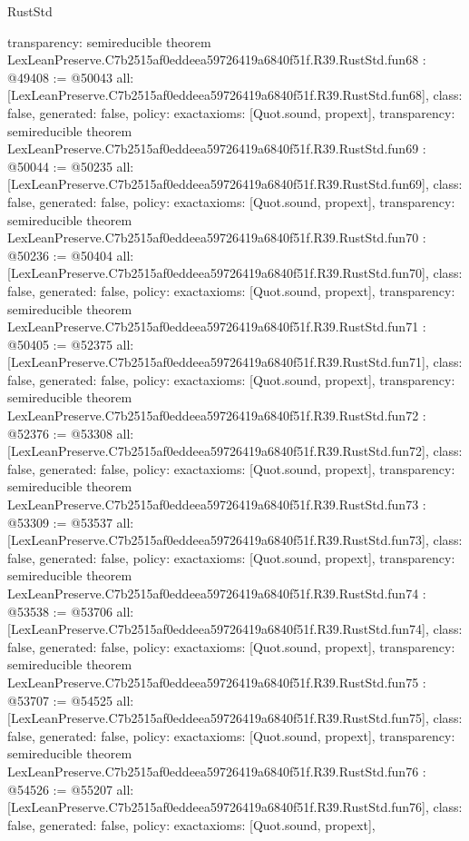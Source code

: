 \begin{lexlean}{RustStd}
\begin{coremodule}
{  transparency: semireducible
}
theorem LexLeanPreserve.C7b2515af0eddeea59726419a6840f51f.R39.RustStd.fun68 : @49408 := @50043 {
  all: [LexLeanPreserve.C7b2515af0eddeea59726419a6840f51f.R39.RustStd.fun68],
  class: false,
  generated: false,
  policy: exact{axioms: [Quot.sound, propext]},
  transparency: semireducible
}
theorem LexLeanPreserve.C7b2515af0eddeea59726419a6840f51f.R39.RustStd.fun69 : @50044 := @50235 {
  all: [LexLeanPreserve.C7b2515af0eddeea59726419a6840f51f.R39.RustStd.fun69],
  class: false,
  generated: false,
  policy: exact{axioms: [Quot.sound, propext]},
  transparency: semireducible
}
theorem LexLeanPreserve.C7b2515af0eddeea59726419a6840f51f.R39.RustStd.fun70 : @50236 := @50404 {
  all: [LexLeanPreserve.C7b2515af0eddeea59726419a6840f51f.R39.RustStd.fun70],
  class: false,
  generated: false,
  policy: exact{axioms: [Quot.sound, propext]},
  transparency: semireducible
}
theorem LexLeanPreserve.C7b2515af0eddeea59726419a6840f51f.R39.RustStd.fun71 : @50405 := @52375 {
  all: [LexLeanPreserve.C7b2515af0eddeea59726419a6840f51f.R39.RustStd.fun71],
  class: false,
  generated: false,
  policy: exact{axioms: [Quot.sound, propext]},
  transparency: semireducible
}
theorem LexLeanPreserve.C7b2515af0eddeea59726419a6840f51f.R39.RustStd.fun72 : @52376 := @53308 {
  all: [LexLeanPreserve.C7b2515af0eddeea59726419a6840f51f.R39.RustStd.fun72],
  class: false,
  generated: false,
  policy: exact{axioms: [Quot.sound, propext]},
  transparency: semireducible
}
theorem LexLeanPreserve.C7b2515af0eddeea59726419a6840f51f.R39.RustStd.fun73 : @53309 := @53537 {
  all: [LexLeanPreserve.C7b2515af0eddeea59726419a6840f51f.R39.RustStd.fun73],
  class: false,
  generated: false,
  policy: exact{axioms: [Quot.sound, propext]},
  transparency: semireducible
}
theorem LexLeanPreserve.C7b2515af0eddeea59726419a6840f51f.R39.RustStd.fun74 : @53538 := @53706 {
  all: [LexLeanPreserve.C7b2515af0eddeea59726419a6840f51f.R39.RustStd.fun74],
  class: false,
  generated: false,
  policy: exact{axioms: [Quot.sound, propext]},
  transparency: semireducible
}
theorem LexLeanPreserve.C7b2515af0eddeea59726419a6840f51f.R39.RustStd.fun75 : @53707 := @54525 {
  all: [LexLeanPreserve.C7b2515af0eddeea59726419a6840f51f.R39.RustStd.fun75],
  class: false,
  generated: false,
  policy: exact{axioms: [Quot.sound, propext]},
  transparency: semireducible
}
theorem LexLeanPreserve.C7b2515af0eddeea59726419a6840f51f.R39.RustStd.fun76 : @54526 := @55207 {
  all: [LexLeanPreserve.C7b2515af0eddeea59726419a6840f51f.R39.RustStd.fun76],
  class: false,
  generated: false,
  policy: exact{axioms: [Quot.sound, propext]},
}
\end{coremodule}
\end{lexlean}
